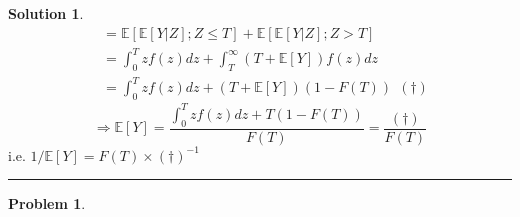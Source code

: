 \documentclass[a4paper, 10pt]{article}
\theoremstyle{definition}
\newtheorem{problem}{Problem}
\theoremstyle{hSol}
\newtheorem*{solution}{Solution}
\begin{document}
\begin{solution}
\begin{equation}
\begin{split}
    &=\mathbb{E}\left[\mathbb{E}\left[Y|Z\right]; Z\leq T\right] + \mathbb{E}\left[\mathbb{E}\left[Y|Z\right]; Z>T\right]\\
    &= \int_0^T z f(z) dz + \int_T^{\infty} (T+\mathbb{E}\left[Y\right]) f(z)dz \\
    &= \int_0^T z f(z) dz + (T+\mathbb{E}\left[Y\right])(1-F(T))~~(\dag)
  \end{split}
\end{equation}
\begin{equation}
  \Rightarrow \mathbb{E}\left[Y\right] = \frac{\int_0^T z f(z) dz + T(1-F(T))}{F(T)} = \frac{(\dag)}{F(T)}
\end{equation}
i.e. $1/\mathbb{E}\left[Y\right]=F(T)\times (\dag)^{-1}$
\end{solution}

\noindent\rule{16cm}{0.4pt}
\begin{problem} 
\end{problem}
\end{document}
